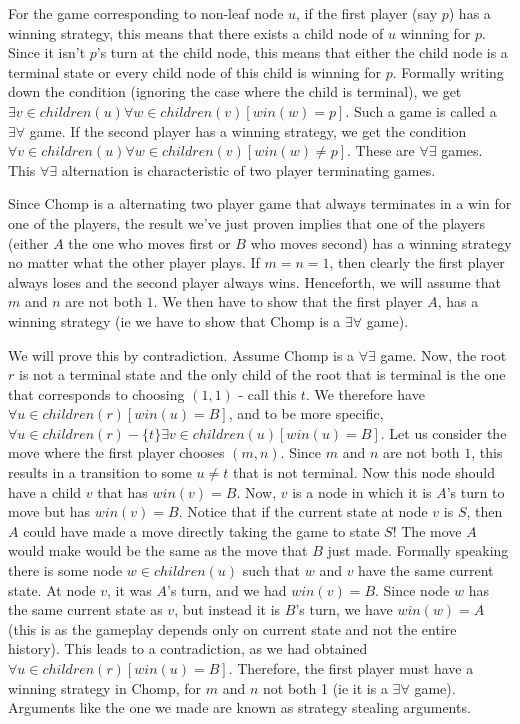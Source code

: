 \documentclass[12pt]{report}
\begin{document}
For the game corresponding to non-leaf node $u$, if the first player (say $p$) has a winning strategy, this means that there exists a child node of $u$ winning for $p$. Since it isn't $p$'s turn at the child node, this means that either the child node is a terminal state or every child node of this child is winning for $p$. Formally writing down the condition (ignoring the case where the child is terminal), we get  $\exists v \in children(u) \forall w \in children(v) \left[win(w) = p\right]$. Such a game is called a $\exists \forall$ game. If the second player has a winning strategy, we get the condition $\forall v \in children(u) \forall w \in children(v) \left[win(w) \neq p\right]$. These are $\forall \exists$ games. This $\forall \exists$ alternation is characteristic of two player terminating games.

Since Chomp is a alternating two player game that always terminates in a win for one of the players, the result we've just proven implies that one of the players (either $A$ the one who moves first or $B$ who moves second) has a winning strategy no matter what the other player plays. If $m = n = 1$, then clearly the first player always loses and the second player always wins. Henceforth, we will assume that $m$ and $n$ are not both $1$. We then have to show that the first player $A$, has a winning strategy (ie we have to show that Chomp is a $\exists \forall$ game). 

We will prove this by contradiction. Assume Chomp is a $\forall \exists$ game. Now, the root $r$ is not a terminal state and the only child of the root that is terminal is the one that corresponds to choosing $(1, 1)$ - call this $t$.  We therefore have $\forall u \in children(r) \left[win(u) = B\right]$, and to be more specific, $\forall u \in children(r) - \{t\} \exists v \in children(u) \left[win(u) = B\right]$. Let us consider the move where the first player chooses $(m, n)$. Since $m$ and $n$ are not both $1$, this results in a transition to some $u \neq t$ that is not terminal. Now this node should have a child $v$ that has $win(v) = B$. Now, $v$ is a node in which it is $A$'s turn to move but has $win(v) = B$. Notice that if the current state at node $v$ is $S$, then $A$ could have made a move directly taking the game to state $S$! The move $A$ would make would be the same as the move that $B$ just made. Formally speaking there is some node $w \in children(u)$ such that $w$ and $v$ have the same current state. At node $v$, it was $A$'s turn, and we had $win(v) = B$. Since node $w$ has the same current state as $v$, but instead it is $B$'s turn, we have $win(w) = A$ (this is as the gameplay depends only on current state and not the entire history). This leads to a contradiction, as we had obtained $\forall u \in children(r) \left[win(u) = B\right]$. Therefore, the first player must have a winning strategy in Chomp, for $m$ and $n$ not both 1 (ie it is a $\exists \forall$ game). Arguments like the one we made are known as strategy stealing arguments.
\end{document}
